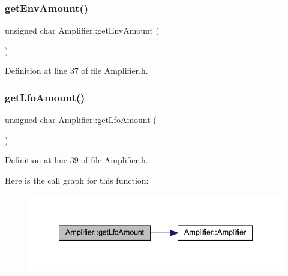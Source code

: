 \subsubsection{\texorpdfstring{get\+Env\+Amount()}{getEnvAmount()}}
{\footnotesize\ttfamily unsigned char Amplifier\+::get\+Env\+Amount (\begin{DoxyParamCaption}{ }\end{DoxyParamCaption})\hspace{0.3cm}{\ttfamily [inline]}}



Definition at line 37 of file Amplifier.\+h.

\mbox{\label{class_amplifier_aeb4c113b992aae7b6fa96fb7ebf9a5ca}} 
\subsubsection{\texorpdfstring{get\+Lfo\+Amount()}{getLfoAmount()}}
{\footnotesize\ttfamily unsigned char Amplifier\+::get\+Lfo\+Amount (\begin{DoxyParamCaption}{ }\end{DoxyParamCaption})\hspace{0.3cm}{\ttfamily [inline]}}



Definition at line 39 of file Amplifier.\+h.

Here is the call graph for this function\+:
\nopagebreak
\begin{figure}[H]
\begin{center}
\leavevmode
\includegraphics[width=334pt]{class_amplifier_aeb4c113b992aae7b6fa96fb7ebf9a5ca_cgraph}
\end{center}
\end{figure}
\mbox{\label{class_amplifier_a3f1ec0c50fdb0adb71e2f7576e38170a}} 
